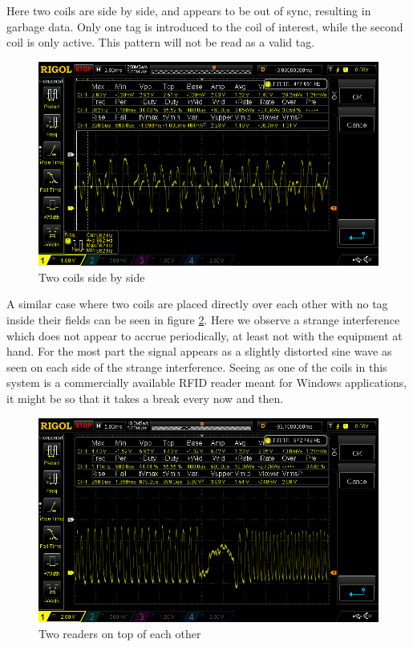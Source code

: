Here two coils are side by side, and appears to be out of sync, resulting in garbage data. Only one tag is introduced to the coil of interest, while the second coil is only active. This pattern will not be read as a valid tag.

\begin{figure}[H]
    \centering
    \includegraphics[width=\textwidth]{06_My_Testing_Results/figures/Several_readers_close/Besides_each_other.png}
    \caption{Two coils side by side}
    \label{fig:CoilSideBySide}
\end{figure}

A similar case where two coils are placed directly over each other with no tag inside their fields can be seen in figure \ref{fig:06:OnTopEO}. Here we observe a strange interference which does not appear to accrue periodically, at least not with the equipment at hand. 
For the most part the signal appears as a slightly distorted sine wave as seen on each side of the strange interference. Seeing as one of the coils in this system is a commercially available RFID reader meant for Windows applications, it might be so that it takes a break every now and then.

\begin{figure}[H]
    \centering
    \includegraphics[width=\textwidth]{06_My_Testing_Results/figures/Several_readers_close/On_top_off_each_other.png}
    \caption{Two readers on top of each other}
    \label{fig:06:OnTopEO}
\end{figure}

